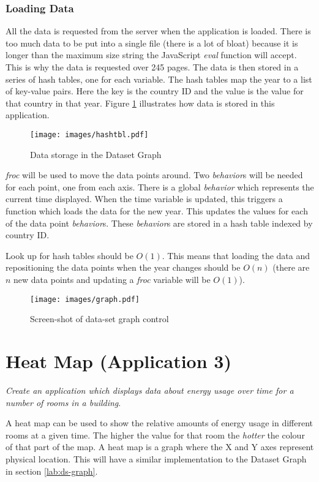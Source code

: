 \subsubsection{Loading Data}
All the data is requested from the server when the application is loaded. There is too much data to be put into a single file (there is a lot of bloat) because it is longer than the maximum size string the JavaScript \emph{eval} function will accept. This is why the data is requested over 245 pages. The data is then stored in a series of hash tables, one for each variable. The hash tables map the year to a list of key-value pairs. Here the key is the country ID and the value is the value for that country in that year. Figure \ref{fig:hashtbl} illustrates how data is stored in this application.

\begin{figure}
\centering
\texttt{[image: images/hashtbl.pdf]}
\caption{Data storage in the Dataset Graph}
\label{fig:hashtbl}
\end{figure}

\emph{froc} will be used to move the data points around. Two \emph{behavior}s will be needed for each point, one from each axis. There is a global \emph{behavior} which represents the current time displayed. When the time variable is updated, this triggers a function which loads the data for the new year. This updates the values for each of the data point \emph{behavior}s. These \emph{behavior}s are stored in a hash table indexed by country ID.

Look up for hash tables should be $O(1)$. This means that loading the data and repositioning the data points when the year changes should be $O(n)$ (there are $n$ new data points and updating a \emph{froc} variable will be $O(1)$).

\begin{figure}
  \centering
  \texttt{[image: images/graph.pdf]}
  \caption{Screen-shot of data-set graph control}
  \label{fig:graph}
\end{figure}

\section{Heat Map (Application 3)}
\emph{Create an application which displays data about energy usage over time for a number of rooms in a building}.

A heat map can be used to show the relative amounts of energy usage in different rooms at a given time. The higher the value for that room the \emph{hotter} the colour of that part of the map. A heat map is a graph where the X and Y axes represent physical location. This will have a similar implementation to the Dataset Graph in section \ref{lab:ds-graph}.

